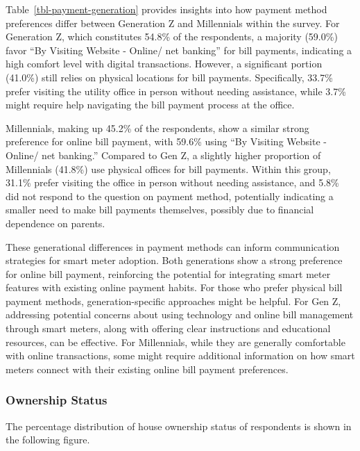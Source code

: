 \documentclass[
  letterpaper,
  DIV=11,
  numbers=noendperiod]{scrartcl}
\begin{document}
Table~\ref{tbl-payment-generation} provides insights into how payment
method preferences differ between Generation Z and Millennials within
the survey. For Generation Z, which constitutes 54.8\% of the
respondents, a majority (59.0\%) favor ``By Visiting Website - Online/
net banking'' for bill payments, indicating a high comfort level with
digital transactions. However, a significant portion (41.0\%) still
relies on physical locations for bill payments. Specifically, 33.7\%
prefer visiting the utility office in person without needing assistance,
while 3.7\% might require help navigating the bill payment process at
the office.

Millennials, making up 45.2\% of the respondents, show a similar strong
preference for online bill payment, with 59.6\% using ``By Visiting
Website - Online/ net banking.'' Compared to Gen Z, a slightly higher
proportion of Millennials (41.8\%) use physical offices for bill
payments. Within this group, 31.1\% prefer visiting the office in person
without needing assistance, and 5.8\% did not respond to the question on
payment method, potentially indicating a smaller need to make bill
payments themselves, possibly due to financial dependence on parents.

These generational differences in payment methods can inform
communication strategies for smart meter adoption. Both generations show
a strong preference for online bill payment, reinforcing the potential
for integrating smart meter features with existing online payment
habits. For those who prefer physical bill payment methods,
generation-specific approaches might be helpful. For Gen Z, addressing
potential concerns about using technology and online bill management
through smart meters, along with offering clear instructions and
educational resources, can be effective. For Millennials, while they are
generally comfortable with online transactions, some might require
additional information on how smart meters connect with their existing
online bill payment preferences.

\subsubsection{Ownership Status}\label{ownership-status}

The percentage distribution of house ownership status of respondents is
shown in the following figure.
\end{document}
